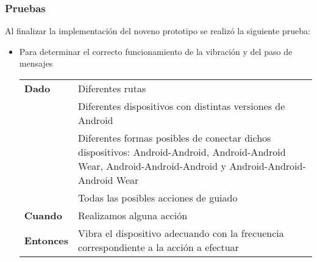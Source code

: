 \subsubsection{Pruebas}

Al finalizar la implementación del noveno prototipo se realizó la siguiente prueba:

\begin{itemize}
  \item Para determinar el correcto funcionamiento de la vibración y del paso de mensajes

  \begin{tabular}{p{}p{}}
    \hline
    \textbf{Dado}     & Diferentes rutas \\
                      & Diferentes dispositivos con distintas versiones de Android \\
                      & Diferentes formas posibles de conectar dichos dispositivos:
                        Android-Android, Android-Android Wear, Android-Android-Android y 
                        Android-Android-Android Wear \\
                      & Todas las posibles acciones de guiado \\
    \textbf{Cuando}   & Realizamos alguna acción \\
    \textbf{Entonces} & Vibra el dispositivo adecuando con la frecuencia correspondiente a
                        la acción a efectuar \\
    \hline
  \end{tabular}
\end{itemize}

